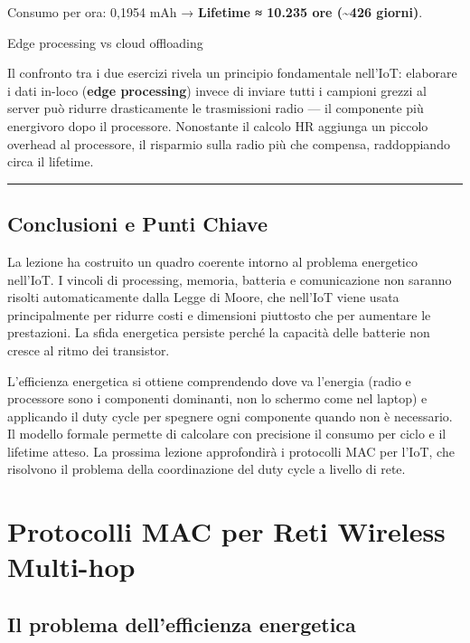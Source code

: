 \documentclass[
  italian,
  openany]{book}
\begin{document}
Consumo per ora: 0,1954 mAh → \textbf{Lifetime ≈ 10.235 ore
(\textasciitilde426 giorni)}.

\begin{callouttip}{Edge processing vs cloud offloading}

Il confronto tra i due esercizi rivela un principio fondamentale
nell'IoT: elaborare i dati in-loco (\textbf{edge processing}) invece di
inviare tutti i campioni grezzi al server può ridurre drasticamente le
trasmissioni radio --- il componente più energivoro dopo il processore.
Nonostante il calcolo HR aggiunga un piccolo overhead al processore, il
risparmio sulla radio più che compensa, raddoppiando circa il lifetime.

\end{callouttip}

\begin{center}\rule{0.5\linewidth}{0.5pt}\end{center}

\section{Conclusioni e Punti Chiave}\label{conclusioni-e-punti-chiave}

La lezione ha costruito un quadro coerente intorno al problema
energetico nell'IoT. I vincoli di processing, memoria, batteria e
comunicazione non saranno risolti automaticamente dalla Legge di Moore,
che nell'IoT viene usata principalmente per ridurre costi e dimensioni
piuttosto che per aumentare le prestazioni. La sfida energetica persiste
perché la capacità delle batterie non cresce al ritmo dei transistor.

L'efficienza energetica si ottiene comprendendo dove va l'energia (radio
e processore sono i componenti dominanti, non lo schermo come nel
laptop) e applicando il duty cycle per spegnere ogni componente quando
non è necessario. Il modello formale permette di calcolare con
precisione il consumo per ciclo e il lifetime atteso. La prossima
lezione approfondirà i protocolli MAC per l'IoT, che risolvono il
problema della coordinazione del duty cycle a livello di rete.

\newpage

\chapter{Protocolli MAC per Reti Wireless
Multi-hop}\label{protocolli-mac-per-reti-wireless-multi-hop}

\section{Il problema dell'efficienza
energetica}\label{il-problema-dellefficienza-energetica}
\end{document}
